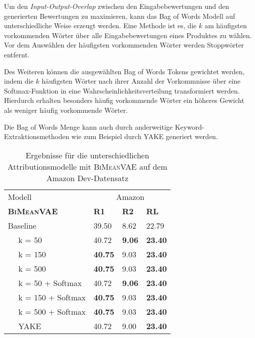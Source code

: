 Um den \textit{Input-Output-Overlap} zwischen den Eingabebewertungen und den generierten Bewertungen zu maximieren, kann das Bag of Words Modell auf unterschiedliche Weise erzeugt werden. 
Eine Methode ist es, die $k$ am häufigsten vorkommenden Wörter über alle Eingabebewertungen eines Produktes zu wählen.
Vor dem Auswählen der häufigsten vorkommenden Wörter werden Stoppwörter entfernt.

Des Weiteren können die ausgewählten Bag of Words Tokens gewichtet werden, indem die $k$ häufigsten Wörter nach ihrer Anzahl der Vorkommnisse über eine Softmax-Funktion in eine Wahrscheinlichkeitsverteilung transformiert werden.
Hierdurch erhalten besonders häufig vorkommende Wörter ein höheres Gewicht als weniger häufig vorkommende Wörter.

Die Bag of Words Menge kann auch durch anderweitige Keyword-Extraktionsmethoden wie zum Beispiel durch YAKE \citep{CAMPOS2020257} generiert werden.


\begin{table}[h!]
    \centering
    \begin{tabular}{@{}llll@{}}
    \toprule
                    Modell   & \multicolumn{3}{c}{Amazon}              \\ 
    \textbf{\textsc{BiMeanVAE} }    & \textbf{R1} & \textbf{R2} & \textbf{RL} \\ \midrule
    Baseline        & 39.50       & 8.62    &  22.79     \\
    $\quad$ k = 50       &  40.72    &   \textbf{9.06}    &   \textbf{23.40}   \\
    $\quad$ k = 150  &  \textbf{40.75}   &    9.03  &  \textbf{23.40}   \\
    $\quad$ k = 500 &  \textbf{40.75}   &    9.03  &  \textbf{23.40}   \\
    $\quad$ k = 50 + Softmax    &  40.72    &   \textbf{9.06}    &    \textbf{23.40}   \\
    $\quad$ k = 150 + Softmax  &  \textbf{40.75}   &    9.03  &  \textbf{23.40}   \\
    $\quad$ k = 500 + Softmax   &  \textbf{40.75}   &    9.03  &  \textbf{23.40}   \\
    $\quad$ YAKE &  40.72   &     9.00  &  \textbf{23.40}   \\ \bottomrule
    \end{tabular}
    \caption{Ergebnisse für die unterschiedlichen Attributionsmodelle mit \textsc{BiMeanVAE} auf dem Amazon Dev-Datensatz}
    \label{bow_opti}
\end{table}

